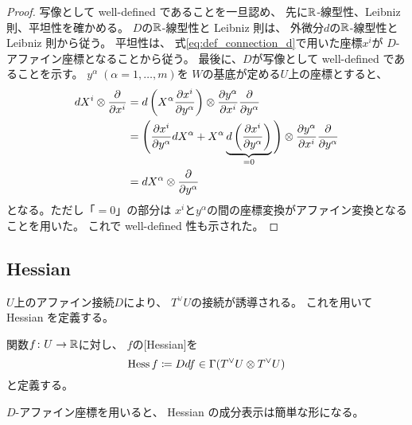 \documentclass[report]{jlreq}
\begin{document}
\begin{proof}
    写像として well-defined であることを一旦認め、
    先に$\mathbb{R}$-線型性、Leibniz 則、平坦性を確かめる。
    $D$の$\mathbb{R}$-線型性と Leibniz 則は、
    外微分$d$の$\mathbb{R}$-線型性と Leibniz 則から従う。
    平坦性は、
    式\cref{eq:def_connection_d}で用いた座標$x^i$が
    $D$-アファイン座標となることから従う。
    最後に、$D$が写像として well-defined であることを示す。
    $y^\alpha \; (\alpha = 1, \dots, m)$を
    $W$の基底が定める$U$上の座標とすると、
    \begin{alignat}{1}
        dX^i \otimes \deldel{x^i}
            &=
                d\myparen{
                    X^\alpha \deldel[x^i]{y^\alpha}
                }
                \otimes
                \deldel[y^\alpha]{x^i}
                \deldel{y^\alpha}
                \\
            &=
                \Bigg(
                    \deldel[x^i]{y^\alpha} dX^\alpha
                    +
                    X^\alpha \underbrace{
                        d\myparen{
                            \deldel[x^i]{y^\alpha}
                        }
                    }_{=0}
                \Bigg)
                \otimes
                \deldel[y^\alpha]{x^i}
                \deldel{y^\alpha}
                \\
            &=
                dX^\alpha
                \otimes
                \deldel{y^\alpha}
    \end{alignat}
    となる。ただし「$= 0$」の部分は
    $x^i$と$y^\alpha$の間の座標変換がアファイン変換となることを用いた。
    これで well-defined 性も示された。
\end{proof}

\subsection{Hessian}

$U$上のアファイン接続$D$により、
$T^\vee U$の接続が誘導される。
これを用いて Hessian を定義する。

\begin{definition}[Hessian]
    \smooth 関数$f \colon U \to \mathbb{R}$に対し、
    $f$の[Hessian]を
    \begin{equation}
        \operatorname{Hess} f \coloneqq Ddf
            \in \Gamma(T^\vee U \otimes T^\vee U)
    \end{equation}
    と定義する。
\end{definition}

$D$-アファイン座標を用いると、
Hessian の成分表示は簡単な形になる。
\end{document}
